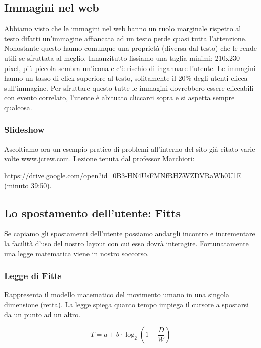 		\subsection{Immagini nel web}
			Abbiamo visto che le immagini nel web hanno un ruolo marginale rispetto al testo difatti un'immagine affiancata ad un testo perde quasi tutta l'attenzione. Nonostante questo hanno comunque una proprietà (diversa dal testo) che le rende utili se sfruttata al meglio. Innanzitutto fissiamo una taglia minimi: 210x230 pixel, più piccola sembra un'icona e c'è rischio di ingannare l'utente. Le immagini hanno un tasso di click superiore al testo, solitamente il 20\% degli utenti clicca sull'immagine. Per sfruttare questo tutte le immagini dovrebbero essere cliccabili con evento correlato, l'utente è abituato cliccarci sopra e si aspetta sempre qualcosa.
			
			\subsubsection{Slideshow}
				Ascoltiamo ora un esempio pratico di problemi all'interno del sito già citato varie volte \href{http://www.jcrew.com}{www.jcrew.com}.
				Lezione tenuta dal professor Marchiori: 
								
				\url{https://drive.google.com/open?id=0B3-HN4UsFMNfRHZWZDVRaWh0U1E} (minuto 39:50).
			
		\subsection{Lo spostamento dell'utente: Fitts}	
			Se capiamo gli spostamenti dell'utente possiamo andargli incontro e incrementare la facilità d'uso del nostro layout con cui esso dovrà interagire. Fortunatamente una legge matematica viene in nostro soccorso.
		
			\subsubsection{Legge di Fitts}
				Rappresenta il modello matematico del movimento umano in una singola dimensione (retta). La legge spiega quanto tempo impiega il cursore a spostarsi da un punto ad un altro.
			
					\begin{equation}
						\label{eqn:LeggeDiFitts}
						T=a+b \cdot \log_2 (1+\frac{D}{W})
					\end{equation}
					

